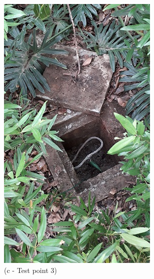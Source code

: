 \begin{figure}
\begin{minipage}[b]{0.22\linewidth}
\end{minipage}
\hspace{0.03cm}
\begin{minipage}[b]{0.22\linewidth}
	\centering
	\includegraphics[width=\textwidth]{figures/R1P_grounding/grounding3.jpg}
	\caption*{(c - Test point 3)}
\end{minipage}
\hspace{0.03cm}
\begin{minipage}[b]{0.22\linewidth}

\end{minipage}
\end{figure}
